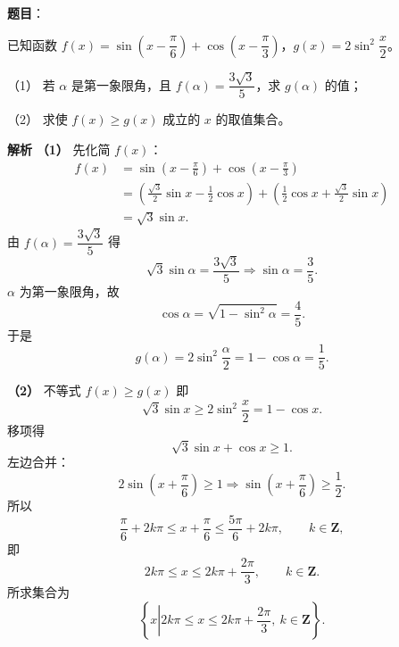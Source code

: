 \begin{answer}

\textbf{题目}：

已知函数 $f(x)=\sin\left(x-\dfrac{\pi}{6}\right)+\cos\left(x-\dfrac{\pi}{3}\right)$，$g(x)=2\sin^2\dfrac x2$。

（1） 若 $\alpha$ 是第一象限角，且 $f(\alpha)=\dfrac{3\sqrt3}{5}$，求 $g(\alpha)$ 的值；

（2） 求使 $f(x)\geqslant g(x)$ 成立的 $x$ 的取值集合。

\textbf{解析}
\textbf{（1）} 先化简 $f(x)$：
\nopagebreak[4]
\[\begin{aligned}
f(x)&=\sin\left(x-\frac\pi6\right)+\cos\left(x-\frac\pi3\right)\\
&=\left(\frac{\sqrt3}{2}\sin x-\frac12\cos x\right)
+\left(\frac12\cos x+\frac{\sqrt3}{2}\sin x\right)\\
&=\sqrt3\sin x.
\end{aligned}\]
由 $f(\alpha)=\dfrac{3\sqrt3}{5}$ 得
\nopagebreak[4]
\[\sqrt3\sin\alpha=\frac{3\sqrt3}{5}\Longrightarrow\sin\alpha=\frac35.\]
$\alpha$ 为第一象限角，故
\nopagebreak[4]
\[\cos\alpha=\sqrt{1-\sin^2\alpha}=\frac45.\]
于是
\nopagebreak[4]
\[g(\alpha)=2\sin^2\frac\alpha2=1-\cos\alpha=\frac15.\]

\textbf{（2）} 不等式 $f(x)\geqslant g(x)$ 即
\nopagebreak[4]
\[\sqrt3\sin x\geqslant2\sin^2\frac x2=1-\cos x.\]
移项得
\nopagebreak[4]
\[\sqrt3\sin x+\cos x\geqslant1.\]
左边合并：
\nopagebreak[4]
\[2\sin\left(x+\frac\pi6\right)\geqslant1
\Longrightarrow\sin\left(x+\frac\pi6\right)\geqslant\frac12.\]
所以
\nopagebreak[4]
\[\frac\pi6+2k\pi\leqslant x+\frac\pi6\leqslant\frac{5\pi}{6}+2k\pi,\qquad k\in\mathbf Z,\]
即
\nopagebreak[4]
\[2k\pi\leqslant x\leqslant2k\pi+\frac{2\pi}{3},\qquad k\in\mathbf Z.\]
所求集合为
\nopagebreak[4]
\[\left\{x\left|2k\pi\leqslant x\leqslant2k\pi+\frac{2\pi}{3},\ k\in\mathbf Z\right.\right\}.\]



\end{answer}
